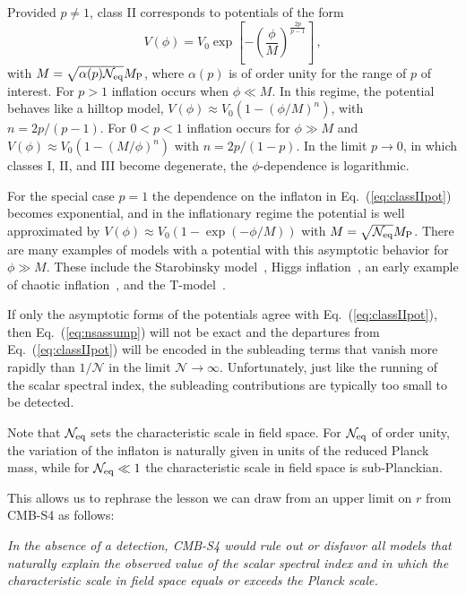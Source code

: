 Provided $p\neq 1$, class II corresponds to potentials of the form 
\begin{equation}\label{eq:classIIpot}
V(\phi)=V_0\exp\left[-\left(\frac{\phi}{M}\right)^{\frac{2p}{p-1}}\right]\,,
\end{equation}
with $M=\sqrt{\alpha(p)\mathcal{N}_{\rm eq}}M_{\rm P}$, where $\alpha(p)$ is of order unity for the range of $p$ of interest. For $p>1$ inflation occurs when $\phi\ll M$. In this regime, the potential behaves like a hilltop model, $V(\phi)\approx V_0(1-\left(\phi/M\right)^n)$, with $n=2p/(p-1)$. For $0<p<1$ inflation occurs for $\phi\gg M$ and $V(\phi)\approx V_0(1-\left(M/\phi\right)^n)$ with $n=2p/(1-p)$. In the limit $p\to0$, in which classes I, II, and III become degenerate, the $\phi$-dependence is logarithmic. 

For the special case $p=1$ the dependence on the inflaton in Eq.~(\ref{eq:classIIpot}) becomes exponential, and in the inflationary regime the potential is well approximated by $V(\phi)\approx V_0\left(1-\exp\left(-\phi/M\right)\right)$ with $M=\sqrt{\mathcal{N}_{\rm eq}}M_{\rm P}$. There are many examples of models with a potential with this asymptotic behavior for $\phi\gg M$. These include the Starobinsky model~\cite{Starobinsky:1980te}, Higgs inflation~\cite{Salopek:1988qh,Bezrukov:2007ep}, an early example of chaotic inflation~\cite{Goncharov:1983mw}, and the T-model~\cite{Kallosh:2013hoa}.

If only the asymptotic forms of the potentials agree with Eq.~(\ref{eq:classIIpot}), then Eq.~(\ref{eq:nsassump}) will not be exact and the departures from Eq.~(\ref{eq:classIIpot}) will be encoded in the subleading terms that vanish more rapidly than $1/\mathcal{N}$ in the limit $\mathcal{N}\to\infty$. Unfortunately, just like the running of the scalar spectral index, the subleading contributions are typically too small to be detected.

Note that $\mathcal{N}_{\rm eq}$ sets the characteristic scale in field space. For $\mathcal{N}_{\rm eq}$ of order unity, the variation of the inflaton is naturally given in units of the reduced Planck mass, while for $\mathcal{N}_{\rm eq}\ll 1$ the characteristic scale in field space is sub-Planckian. 

This allows us to rephrase the lesson we can draw from an upper limit on $r$ from CMB-S4 as follows:

{\em In the absence of a detection, CMB-S4 would rule out or disfavor all models that naturally explain the observed value of the scalar spectral index and in which the characteristic scale in field space equals or exceeds the Planck scale.}

